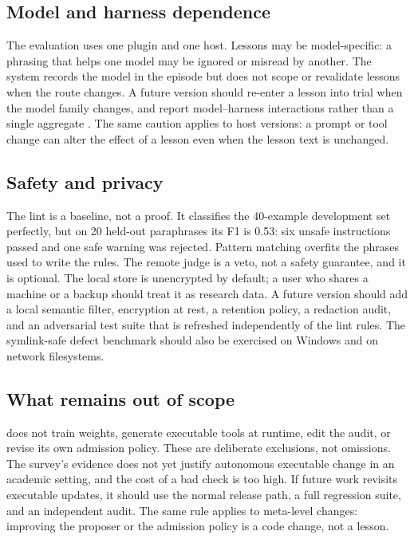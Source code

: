 \subsection{Model and harness dependence}
The evaluation uses one plugin and one host. Lessons may be model-specific: a phrasing that helps one model may be ignored or misread by another. The system records the model in the episode but does not scope or revalidate lessons when the route changes. A future version should re-enter a lesson into trial when the model family changes, and report model--harness interactions rather than a single aggregate \citep{li2026rightfit,tian2026ceiling}. The same caution applies to host versions: a prompt or tool change can alter the effect of a lesson even when the lesson text is unchanged.

\subsection{Safety and privacy}
The lint is a baseline, not a proof. It classifies the 40-example development set perfectly, but on 20 held-out paraphrases its F1 is 0.53: six unsafe instructions passed and one safe warning was rejected. Pattern matching overfits the phrases used to write the rules. The remote judge is a veto, not a safety guarantee, and it is optional. The local store is unencrypted by default; a user who shares a machine or a backup should treat it as research data. A future version should add a local semantic filter, encryption at rest, a retention policy, a redaction audit, and an adversarial test suite that is refreshed independently of the lint rules. The symlink-safe defect benchmark should also be exercised on Windows and on network filesystems.

\subsection{What remains out of scope}
\system{} does not train weights, generate executable tools at runtime, edit the audit, or revise its own admission policy. These are deliberate exclusions, not omissions. The survey's evidence does not yet justify autonomous executable change in an academic setting, and the cost of a bad check is too high. If future work revisits executable updates, it should use the normal release path, a full regression suite, and an independent audit. The same rule applies to meta-level changes: improving the proposer or the admission policy is a code change, not a lesson.

